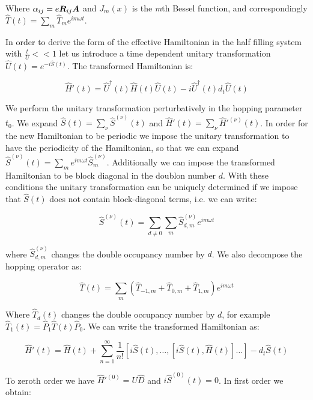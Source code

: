 Where $\alpha_{ij} = e\boldsymbol{R}_{ij}\boldsymbol{A}$ and $J_m(x)$ is the \textit{m}th Bessel function, and correspondingly $\hat{T}(t) = \sum_m \hat{T}_m e^{im \omega t}$.

In order to derive the form of the effective Hamiltonian in the half filling system with $\frac{t}{U} << 1$ let us introduce a time dependent unitary transformation $\hat{U}(t) = e^{-i\hat{S}(t)}$. The transformed Hamiltonian is:

\begin{equation}
\hat{H}'(t) = \hat{U}^\dagger (t) \hat{H}(t) \hat{U}(t) - i\hat{U}^\dagger(t) d_t \hat{U}(t)
\end{equation} 

We perform the unitary transformation perturbatively in the hopping parameter $t_0$. We expand $\hat{S}(t) = \sum_\nu \hat{S}^{(\nu)}(t)$ and $\hat{H}'(t) = \sum_\nu \hat{H}'^{(\nu)}(t)$. In order for the new Hamiltonian to be periodic we impose the unitary transformation to have the periodicity of the Hamiltonian, so that we can expand $\hat{S}^{(\nu)}(t) = \sum_m e^{im\omega t}\hat{S}^{(\nu)}_m$. Additionally we can impose the transformed Hamiltonian to be block diagonal in the doublon number $d$. With these conditions the unitary transformation can be uniquely determined if we impose that $\hat{S}(t)$ does not contain block-diagonal terms, i.e. we can write:

\begin{equation}
\hat{S}^{(\nu)}(t) = \sum_{d \neq 0} \sum_m \hat{S}^{(\nu)}_{d,m} e^{im\omega t}
\end{equation}

where $\hat{S}^{(\nu)}_{d,m}$ changes the double occupancy number by $d$. We also decompose the hopping operator as:

\begin{equation}
\hat{T}(t) = \sum_m (\hat{T}_{-1,m}+\hat{T}_{0,m}+\hat{T}_{1,m})e^{im\omega t}
\end{equation}

Where $\hat{T}_d(t)$ changes the double occupancy number by $d$, for example $\hat{T}_1(t) = \hat{P}_1 \hat{T}(t) \hat{P}_0$. We can write the transformed Hamiltonian as:

\begin{equation}
\label{Perturbation}
\hat{H}'(t) = \hat{H}(t) + \sum_{n=1}^\infty \frac{1}{n!} \left[i\hat{S}(t), \dots, \left[ i\hat{S}(t), \hat{H}(t) \right]\dots \right] - d_t \hat{S}(t)
\end{equation}

To zeroth order we have $\hat{H}'^{(0)}= U\hat{D}$ and $i\hat{S}^{(0)}(t)=0$. In first order we obtain:

